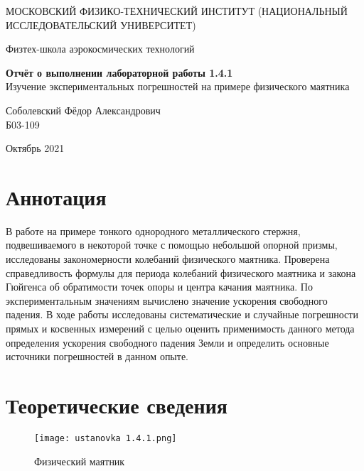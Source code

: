 \documentclass[a4paper,12pt]{article} %
\date{\today}
\begin{document}
\begin{titlepage}
	\begin{center}
		{\large МОСКОВСКИЙ ФИЗИКО-ТЕХНИЧЕСКИЙ ИНСТИТУТ (НАЦИОНАЛЬНЫЙ ИССЛЕДОВАТЕЛЬСКИЙ УНИВЕРСИТЕТ)}
	\end{center}
	\begin{center}
		{\large Физтех-школа аэрокосмических технологий}
	\end{center}
	
	
	\vspace{4.5cm}
	{\huge
		\begin{center}
			{\bf Отчёт о выполнении лабораторной работы 1.4.1}\\
			Изучение экспериментальных погрешностей на примере физического маятника
		\end{center}
	}
	\vspace{1cm}
	\begin{center}
		{\large Соболевский Фёдор Александрович \\
			\vspace{0.2cm}
			Б03-109}
	\end{center}
	\vspace{8cm}
	\begin{center}
		Октябрь 2021
	\end{center}
\end{titlepage}

\section{Аннотация}

В работе на примере тонкого однородного металлического стержня, подвешиваемого в некоторой точке с помощью небольшой опорной призмы, исследованы закономерности колебаний физического маятника. Проверена справедливость формулы для периода колебаний физического маятника и закона Гюйгенса об обратимости
точек опоры и центра качания маятника. По экспериментальным значениям вычислено значение ускорения свободного падения. В ходе работы исследованы систематические и случайные погрешности прямых и косвенных измерений с целью оценить применимость данного метода определения ускорения свободного падения Земли и определить основные источники погрешностей в данном опыте.

\section{Теоретические сведения}

\begin{wrapfigure}{l}{0,3\textwidth}
	\texttt{[image: ustanovka 1.4.1.png]}
	\caption{Физический маятник}\label{risunok}
\end{wrapfigure}
\end{document}
